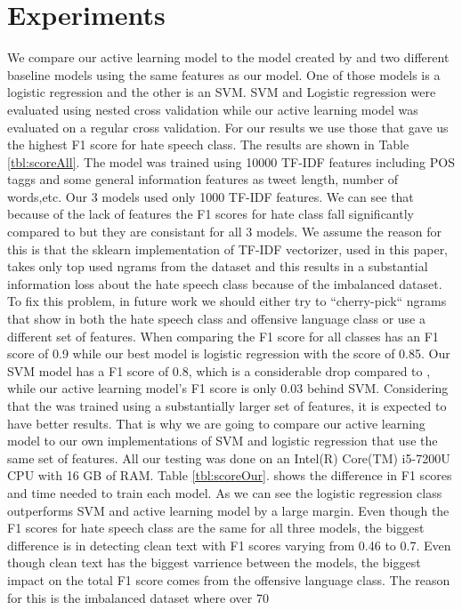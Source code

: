 \documentclass[10pt, a4paper]{article}
\begin{document}
\section{Experiments}
We compare our active learning model to the model created by \cite{Davidson2017AutomatedHS} and two different baseline models using the same features as our model. One of those models is a logistic regression and the other is an SVM. SVM and Logistic regression were evaluated using nested cross validation while our active learning model was evaluated on a regular cross validation. For our results we use those that gave us the highest F1 score for hate speech class. The results are shown in Table \ref{tbl:scoreAll}. The \cite{Davidson2017AutomatedHS} model was trained using 10000 TF-IDF features including POS taggs and some general information features as tweet length, number of words,etc. Our 3 models used only 1000 TF-IDF features. We can see that because of the lack of features the F1 scores for hate class fall significantly compared to \cite{Davidson2017AutomatedHS} but they are consistant for all 3 models. We assume the reason for this is that the sklearn implementation of TF-IDF vectorizer, used in this paper, takes only top used ngrams from the dataset and this results in a substantial information loss about the hate speech class because of the imbalanced dataset.  To fix this problem, in future work we should either try to “cherry-pick“ ngrams that show in both the hate speech class and offensive language class or use a different set of features. When comparing the F1 score for all classes \cite{Davidson2017AutomatedHS} has an F1 score of 0.9 while our best model is logistic regression with the score of 0.85. Our SVM model has a F1 score of 0.8, which is a considerable drop compared to \cite{Davidson2017AutomatedHS}, while our active learning model's F1 score is only 0.03 behind SVM. Considering that the \cite{Davidson2017AutomatedHS} was trained using a substantially larger set of features, it is expected to have better results. That is why we are going to compare our active learning model to our own implementations of SVM and logistic regression that use the same set of features. All our testing was done on an Intel(R) Core(TM) i5-7200U CPU with 16 GB of RAM. Table \ref{tbl:scoreOur}. shows the difference in F1 scores and time needed to train each model. As we can see the logistic regression class outperforms SVM and active learning model by a large margin. Even though the F1 scores for hate speech class are the same for all three models, the biggest difference is in detecting clean text with F1 scores varying from 0.46 to 0.7. Even though clean text has the biggest varrience between the models, the biggest impact on the total F1 score comes from the offensive language class. The reason for this is the imbalanced dataset where over 70%
\end{document}

